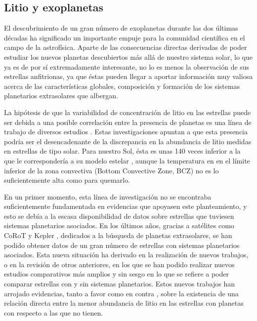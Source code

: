 \subsection{Litio y exoplanetas} \label{sec:litio_exoplanetas}
El descubrimiento de un gran número de exoplanetas durante las dos últimas décadas \citep{Mayor1995, Bonfils2018} ha significado un importante empuje para la comunidad científica en el campo de la astrofísica. Aparte de las consecuencias directas derivadas de poder estudiar los nuevos planetas descubiertos más allá de nuestro sistema solar, lo que ya es de por sí extremadamente interesante, no lo es menos la observación de sus estrellas anfitrionas, ya que éstas pueden llegar a aportar información muy valiosa acerca de las características globales, composición y formación de los sistemas planetarios extrasolares que albergan.\par

La hipótesis de que la variabilidad de concentración de litio en las estrellas puede ser debida a una posible correlación entre la presencia de planetas es una línea de trabajo de diversos estudios \citep{Israelian2009, DelgadoMena2014, Figueira2014}. Estas investigaciones apuntan a que esta presencia podría ser el desencadenante de la discrepancia en la abundancia de litio medidas en estrellas de tipo solar. Para nuestro Sol, ésta es unas 140 veces inferior a la que le correspondería a su modelo estelar \cite{Israelian2009}, aunque la temperatura en en el límite inferior de la zona convectiva (Bottom Convective Zone, BCZ) no es lo suficientemente alta como para quemarlo.\par

En un primer momento, esta línea de investigación no se encontraba suficientemente fundamentada en evidencias que apoyasen este planteamiento, y esto se debía a la escasa disponibilidad de datos sobre estrellas que tuviesen sistemas planetarios asociados. En los últimos años, gracias a satélites como CoRoT \cite{Baglin2006} y Kepler \cite{Borucki2010}, dedicados a la búsqueda de planetas extrasolares, se han podido obtener datos de un gran número de estrellas con sistemas planetarios asociados. Esta nueva situación ha derivado en la realización de nuevos trabajos, o en la revisión de otros anteriores, en los que se han podido realizar nuevos estudios comparativos más amplios y sin sesgo en lo que se refiere a poder comparar estrellas con y sin sistemas planetarios. Estos nuevos trabajos han arrojado evidencias, tanto a favor \citep{Bouvier2008, Israelian2009} como en contra \citep{Baumann2010}, sobre la existencia de una relación directa entre la menor abundancia de litio en las estrellas con planetas con respecto a las que no tienen.\par

